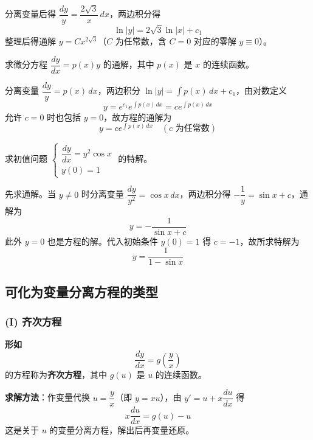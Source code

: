 \begin{solution}
分离变量后得 $\dfrac{dy}{y} = \dfrac{2\sqrt{3}}{x}\,dx$，两边积分得
$$\ln|y| = 2\sqrt{3}\ln|x| + c_1$$
整理后得通解 $y = Cx^{2\sqrt{3}}$（$C$ 为任常数，含 $C = 0$ 对应的零解 $y \equiv 0$）。
\end{solution}

\begin{example}
求微分方程 $\dfrac{dy}{dx} = p(x)y$ 的通解，其中 $p(x)$ 是 $x$ 的连续函数。
\end{example}

\begin{solution}
分离变量 $\dfrac{dy}{y} = p(x)\,dx$，两边积分 $\ln|y| = \int p(x)\,dx + c_1$，由对数定义
$$y = e^{c_1}e^{\int p(x)\,dx} = ce^{\int p(x)\,dx}$$
允许 $c = 0$ 时也包括 $y = 0$，故方程的通解为
$$y = ce^{\int p(x)\,dx} \quad (\text{$c$ 为任常数})$$
\end{solution}

\begin{example}
求初值问题 $\begin{cases} \dfrac{dy}{dx} = y^2\cos x \\ y(0) = 1 \end{cases}$ 的特解。
\end{example}

\begin{solution}
先求通解。当 $y \neq 0$ 时分离变量 $\dfrac{dy}{y^2} = \cos x\,dx$，两边积分得 $-\dfrac{1}{y} = \sin x + c$，通解为
$$y = -\frac{1}{\sin x + c}$$
此外 $y = 0$ 也是方程的解。代入初始条件 $y(0) = 1$ 得 $c = -1$，故所求特解为
$$y = \frac{1}{1 - \sin x}$$
\end{solution}

\subsection{可化为变量分离方程的类型}

\subsubsection{(I) 齐次方程}

\textbf{形如}
\begin{equation}\frac{dy}{dx} = g\left(\frac{y}{x}\right) \tag{2.5}\end{equation}
的方程称为\textbf{齐次方程}，其中 $g(u)$ 是 $u$ 的连续函数。

\textbf{求解方法}：作变量代换 $u = \dfrac{y}{x}$（即 $y = xu$），由 $y' = u + x\dfrac{du}{dx}$ 得
$$x\frac{du}{dx} = g(u) - u$$
这是关于 $u$ 的变量分离方程，解出后再变量还原。

